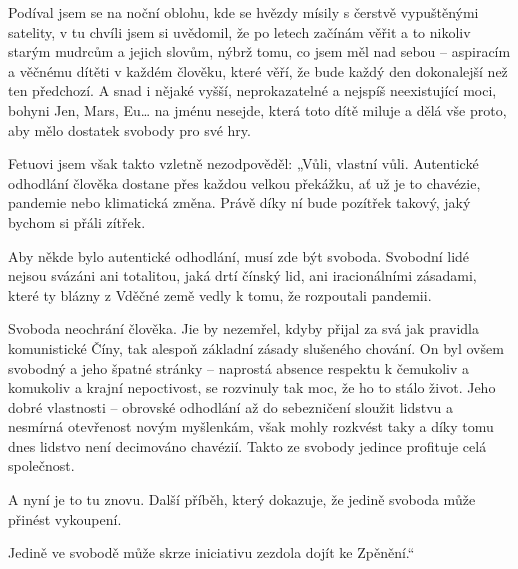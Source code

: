 Podíval jsem se na noční oblohu, kde se hvězdy mísily s čerstvě vypuštěnými satelity, v tu chvíli jsem si uvědomil, že po letech začínám věřit a to nikoliv starým mudrcům a jejich slovům, nýbrž tomu, co jsem měl nad sebou – aspiracím a věčnému dítěti v každém člověku, které věří, že bude každý den dokonalejší než ten předchozí. A snad i nějaké vyšší, neprokazatelné a nejspíš neexistující moci, bohyni Jen, Mars, Eu… na jménu nesejde, která toto dítě miluje a dělá vše proto, aby mělo dostatek svobody pro své hry.

Fetuovi jsem však takto vzletně nezodpověděl: „Vůli, vlastní vůli. Autentické odhodlání člověka dostane přes každou velkou překážku, ať už je to chavézie, pandemie nebo klimatická změna. Právě díky ní bude pozítřek takový, jaký bychom si přáli zítřek. 

Aby někde bylo autentické odhodlání, musí zde být svoboda. Svobodní lidé nejsou svázáni ani totalitou, jaká drtí čínský lid, ani iracionálními zásadami, které ty blázny z Vděčné země vedly k tomu, že rozpoutali pandemii. 

Svoboda neochrání člověka. Jie by nezemřel, kdyby přijal za svá jak pravidla komunistické Číny, tak alespoň základní zásady slušeného chování. On byl ovšem svobodný a jeho špatné stránky – naprostá absence respektu k čemukoliv a komukoliv a krajní nepoctivost, se rozvinuly tak moc, že ho to stálo život. Jeho dobré vlastnosti – obrovské odhodlání až do sebezničení sloužit lidstvu a nesmírná otevřenost novým myšlenkám, však mohly rozkvést taky a díky tomu dnes lidstvo není decimováno chavézií. Takto ze svobody jedince profituje celá společnost.

A nyní je to tu znovu. Další příběh, který dokazuje, že jedině svoboda může přinést vykoupení. 

Jedině ve svobodě může skrze iniciativu zezdola dojít ke Zpěnění.“
